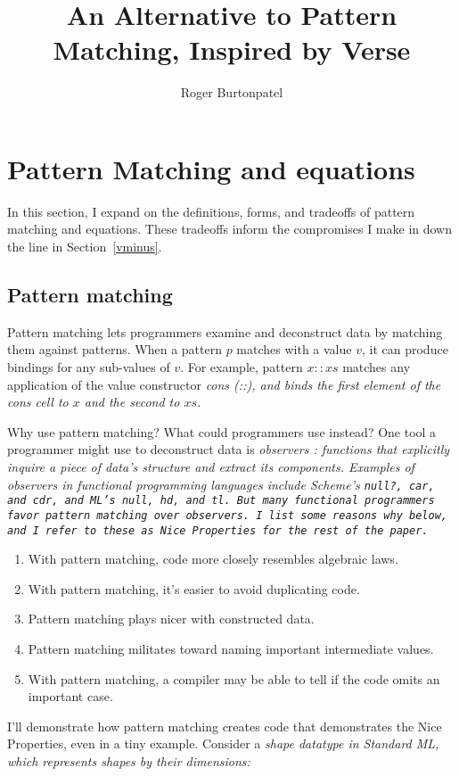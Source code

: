 \documentclass[manuscript,screen,review, 12pt, nonacm]{acmart}
\title{An Alternative to Pattern Matching, Inspired by Verse}
\author{Roger Burtonpatel}
\affiliation{%
  \institution{Tufts University}
  \streetaddress{419 Boston Ave}
  \city{Medford}
  \state{Massachusetts}
  \country{USA}
  \postcode{02155}
}
\begin{document}
\section{Pattern Matching and equations}
\label{pmandequations}

In this section, I expand on the definitions, forms, and tradeoffs of pattern
matching and equations. These tradeoffs inform the compromises I make in
\VMinus down the line in Section~\ref{vminus}.

\subsection{Pattern matching}
\label{pmoverobservers}


Pattern matching lets programmers examine and deconstruct data by matching them
against patterns. When a pattern $p$ matches with a value $v$, it can produce
bindings for any sub-values of $v$. For example, pattern $x::xs$ matches any 
application of the value constructor \it{cons} (\it{::}), and binds the first 
element of the cons cell to $x$ and the second to $xs$. 

Why use pattern matching? What could programmers use instead? One tool a
programmer might use to deconstruct data is \it{observers}
\citep{liskov:abstraction}: functions that explicitly inquire a piece of data's
structure and extract its components. Examples of observers in functional
programming languages include Scheme's \tt{null?}, \tt{car}, and \tt{cdr}, and
ML's \tt{null}, \tt{hd}, and \tt{tl}. But many functional programmers favor
pattern matching over observers. I list some reasons why below, and I refer to
these as Nice Properties for the rest of the paper. 
\bf{\begin{enumerate}
    \item With pattern matching, code more closely resembles algebraic laws. 
    \label{p1}
    \item With pattern matching, it's easier to avoid duplicating code.
    \label{p2}
    \item Pattern matching plays nicer with constructed data. 
    \label{p3}
    \item Pattern matching militates toward naming important intermediate
    values. \nolinebreak
    \label{p4}
    \item With pattern matching, a compiler may be able to tell if the code
    omits an important case. 
    \label{p5}
\end{enumerate}} I'll demonstrate how pattern matching creates code that
demonstrates the Nice Properties, even in a tiny example. Consider a \it{shape}
datatype in Standard ML, which represents shapes by their dimensions: 
\end{document}
